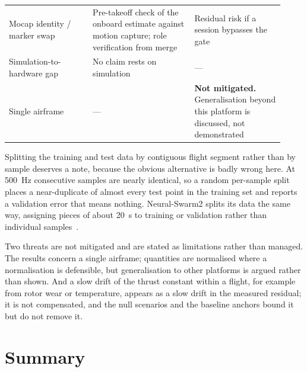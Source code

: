 \begin{table}[t]
\begin{tabular}{@{}p{0.28\linewidth}p{0.34\linewidth}p{0.30\linewidth}@{}}
    Mocap identity / marker swap & Pre-takeoff check of the onboard estimate against motion capture; role verification from merge & Residual risk if a session bypasses the gate \\
    Simulation-to-hardware gap & No claim rests on simulation & --- \\
    Single airframe & --- & \textbf{Not mitigated.} Generalisation beyond this platform is discussed, not demonstrated \\
    \bottomrule
  \end{tabular}
\end{table}

Splitting the training and test data by contiguous flight segment rather than by sample deserves a
note, because the obvious alternative is badly wrong here. At \SI{500}{\hertz} consecutive samples
are nearly identical, so a random per-sample split places a near-duplicate of almost every test
point in the training set and reports a validation error that means nothing. Neural-Swarm2 splits
its data the same way, assigning pieces of about \SI{20}{\second} to training or validation rather
than individual samples~\cite{shi2022neuralswarm2}.

Two threats are not mitigated and are stated as limitations rather than managed. The results
concern a single airframe; quantities are normalised where a normalisation is defensible, but
generalisation to other platforms is argued rather than shown. And a slow drift of the thrust constant within a flight, for example from rotor wear or temperature, appears as a slow drift in the measured residual; it is not compensated, and the null scenarios and the baseline anchors bound it but do not remove it.

\section{Summary}
\label{sec:setup-summary}

